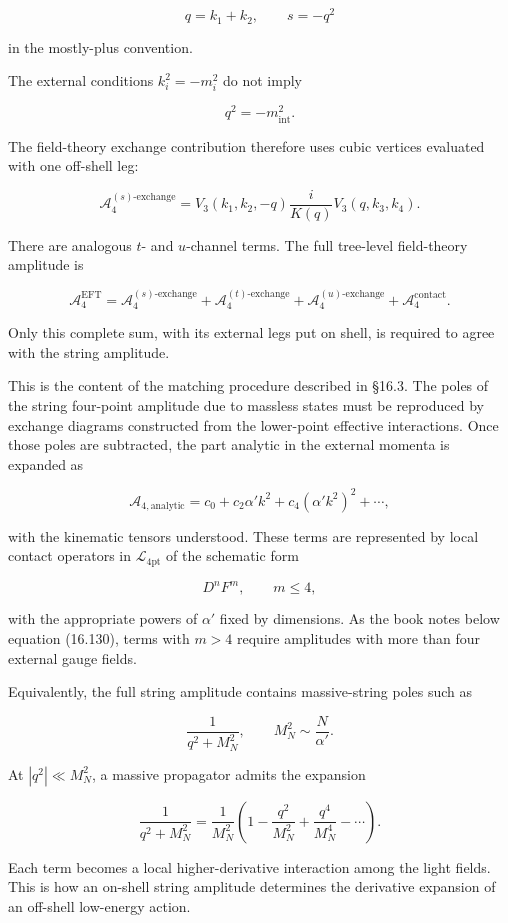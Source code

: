 \documentclass[
  10pt,
  a4paper,
  openany]{book}
\begin{document}
\[
q=k_1+k_2,
\qquad
s=-q^2
\]

in the mostly-plus convention.

The external conditions \(k_i^2=-m_i^2\) do not imply

\[
q^2=-m_{\mathrm{int}}^2.
\]

The field-theory exchange contribution therefore uses cubic vertices
evaluated with one off-shell leg:

\[
\mathcal A_4^{(s)\text{-exchange}}
=
V_3(k_1,k_2,-q)
\frac{i}{K(q)}
V_3(q,k_3,k_4).
\]

There are analogous \(t\)- and \(u\)-channel terms. The full tree-level
field-theory amplitude is

\[
\mathcal A_4^{\mathrm{EFT}}
=
\mathcal A_4^{(s)\text{-exchange}}
+\mathcal A_4^{(t)\text{-exchange}}
+\mathcal A_4^{(u)\text{-exchange}}
+\mathcal A_4^{\mathrm{contact}}.
\]

Only this complete sum, with its external legs put on shell, is required
to agree with the string amplitude.

This is the content of the matching procedure described in §16.3. The
poles of the string four-point amplitude due to massless states must be
reproduced by exchange diagrams constructed from the lower-point
effective interactions. Once those poles are subtracted, the part
analytic in the external momenta is expanded as

\[
\mathcal A_{4,\mathrm{analytic}}
=c_0+c_2\alpha' k^2+c_4(\alpha' k^2)^2+\cdots,
\]

with the kinematic tensors understood. These terms are represented by
local contact operators in \(\mathcal L_{4\mathrm{pt}}\) of the
schematic form

\[
D^nF^m,
\qquad m\leq4,
\]

with the appropriate powers of \(\alpha'\) fixed by dimensions. As the
book notes below equation (16.130), terms with \(m>4\) require
amplitudes with more than four external gauge fields.

Equivalently, the full string amplitude contains massive-string poles
such as

\[
\frac{1}{q^2+M_N^2},
\qquad
M_N^2\sim\frac{N}{\alpha'}.
\]

At \(|q^2|\ll M_N^2\), a massive propagator admits the expansion

\[
\frac{1}{q^2+M_N^2}
=
\frac{1}{M_N^2}
\left(
1-\frac{q^2}{M_N^2}
+\frac{q^4}{M_N^4}
-\cdots
\right).
\]

Each term becomes a local higher-derivative interaction among the light
fields. This is how an on-shell string amplitude determines the
derivative expansion of an off-shell low-energy action.
\end{document}
